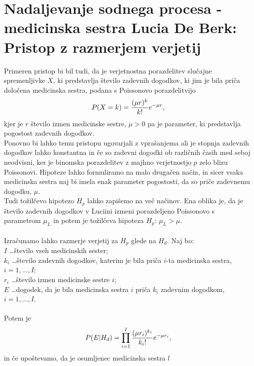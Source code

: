 \documentclass[fin1, tisk]{fmfdelo}
\theoremstyle{definition}
\theoremstyle{trditev}
\theoremstyle{izrek}
\begin{document}
\section{Nadaljevanje sodnega procesa - medicinska sestra Lucia De Berk: Pristop z razmerjem verjetij}
Primeren pristop bi bil tudi, da je verjetnostna porazdelitev slučajne spremenljivke $X$, ki predstavlja število zadevnih dogodkov, ki jim je bila priča 
določena medicinska sestra, podana s Poissonovo porazdelitvijo
\[
    P(X=k) = \frac{(\mu r)^{k}}{k!}e^{-\mu r}, \vspace{2mm}
\]
kjer je $r$ število izmen medicinske sestre, $\mu > 0$ pa je parameter, ki predstavlja pogostost zadevnih dogodkov.\\
Ponovno bi lahko temu pristopu ugovarjali z vprašanjema ali je stopnja zadevnih dogodkov lahko konstantna in če so zadevni dogodki ob različnih časih med seboj neodvisni, ker 
je binomska porazdelitev z majhno verjetnostjo $p$ zelo blizu Poissonovi. Hipoteze lahko formuliramo na malo drugačen način, in sicer vsaka medicinska sestra naj bi imela 
enak parameter pogostosti, da so priče zadevnemu dogodku, $\mu$. \\
Tudi tožilčevo hipotezo $H_p$ lahko zapišemo na več načinov. Ena oblika je, da je število zadevnih dogodkov v Luciini izmeni 
porazdeljeno Poissonovo s parametrom $\mu _L$ in potem je tožilčeva hipoteza $H_p$: $\mu _L > \mu$.\\\\
Izračunamo lahko razmerje verjetij za $H_p$ glede na $H_d$. Naj bo:\\
$I$ \dots število vseh medicinskih sester;\\
$k_i$ \dots število zadevnih dogodkov, katerim je bila priča $i$-ta medicinska sestra, $i = 1, \dots , I$;\\
$r_i$ \dots število izmen medicinske sestre $i$;\\
$E$ \dots dogodek, da je bila medicinska sestra $i$ priča $k_i$ zadevnim dogodkom, $i = 1, \dots , I$.\\\\
Potem je
\[
    P(E \lvert H_d) = \prod_{i=1}^{I} \frac{(\mu r_i)^{k_i}}{k_i!}e^{-\mu r_i},\vspace{2mm}
\]
in če upoštevamo, da je osumljenec medicinska sestra $l$
\end{document}
